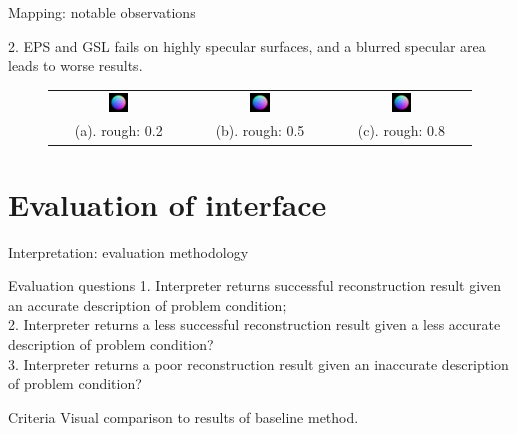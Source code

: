 \documentclass[10pt]{beamer}
\begin{document}
\begin{frame}{Mapping: notable observations}
\begin{exampleblock}{2. EPS and GSL fails on highly specular surfaces, and a blurred specular area leads to worse results.}
\begin{figure}
\begin{tabular}{ccc}
\includegraphics[width=0.15\textwidth]{mapping/ps_spec_rough/0802_normal}&
\includegraphics[width=0.15\textwidth]{mapping/ps_spec_rough/0805_normal}&
\includegraphics[width=0.15\textwidth]{mapping/ps_spec_rough/0808_normal}\\
(a). rough: 0.2 & (b). rough: 0.5 & (c). rough: 0.8
\end{tabular}
\end{figure}
\end{exampleblock}

\end{frame}

\section{Evaluation of interface}
\begin{frame}{Interpretation: evaluation methodology}

\begin{exampleblock}{Evaluation questions}
  1. Interpreter returns successful reconstruction result given an accurate description of problem condition; \\
  2. Interpreter returns a less successful reconstruction result given a less accurate description of problem condition? \\
  3. Interpreter returns a poor reconstruction result given an inaccurate description of problem condition? \\
\end{exampleblock}

\begin{exampleblock}{Criteria}
  Visual comparison to results of baseline method.
\end{exampleblock}

\end{frame}
\end{document}
